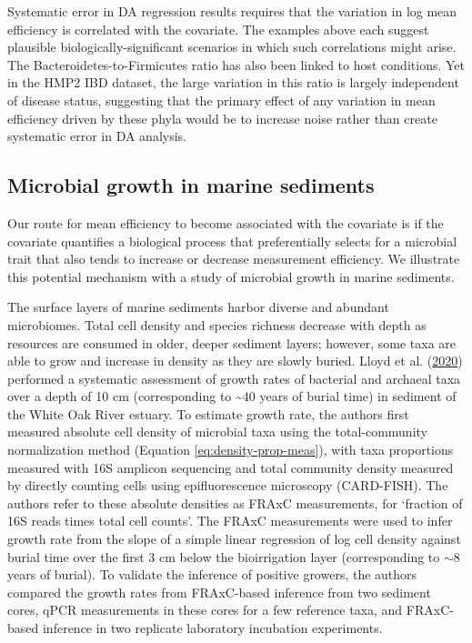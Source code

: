 \documentclass[
]{article}
\begin{document}
Systematic error in DA regression results requires that the variation in log mean efficiency is correlated with the covariate.
The examples above each suggest plausible biologically-significant scenarios in which such correlations might arise.
The Bacteroidetes-to-Firmicutes ratio has also been linked to host conditions.
Yet in the HMP2 IBD dataset, the large variation in this ratio is largely independent of disease status, suggesting that the primary effect of any variation in mean efficiency driven by these phyla would be to increase noise rather than create systematic error in DA analysis.

\hypertarget{microbial-growth-in-marine-sediments}{%
\subsection{Microbial growth in marine sediments}\label{microbial-growth-in-marine-sediments}}

Our route for mean efficiency to become associated with the covariate is if the covariate quantifies a biological process that preferentially selects for a microbial trait that also tends to increase or decrease measurement efficiency.
We illustrate this potential mechanism with a study of microbial growth in marine sediments.

The surface layers of marine sediments harbor diverse and abundant microbiomes. Total cell density and species richness decrease with depth as resources are consumed in older, deeper sediment layers; however, some taxa are able to grow and increase in density as they are slowly buried.
Lloyd et al. (\protect\hyperlink{ref-lloyd2020evid}{2020}) performed a systematic assessment of growth rates of bacterial and archaeal taxa over a depth of 10 cm (corresponding to \textasciitilde40 years of burial time) in sediment of the White Oak River estuary.
To estimate growth rate, the authors first measured absolute cell density of microbial taxa using the total-community normalization method (Equation \eqref{eq:density-prop-meas}), with taxa proportions measured with 16S amplicon sequencing and total community density measured by directly counting cells using epifluorescence microscopy (CARD-FISH).
The authors refer to these absolute densities as FRAxC measurements, for `fraction of 16S reads times total cell counts'.
The FRAxC measurements were used to infer growth rate from the slope of a simple linear regression of log cell density against burial time over the first 3 cm below the bioirrigation layer (corresponding to \(\sim 8\) years of burial).
To validate the inference of positive growers, the authors compared the growth rates from FRAxC-based inference from two sediment cores, qPCR measurements in these cores for a few reference taxa, and FRAxC-based inference in two replicate laboratory incubation experiments.
\end{document}
